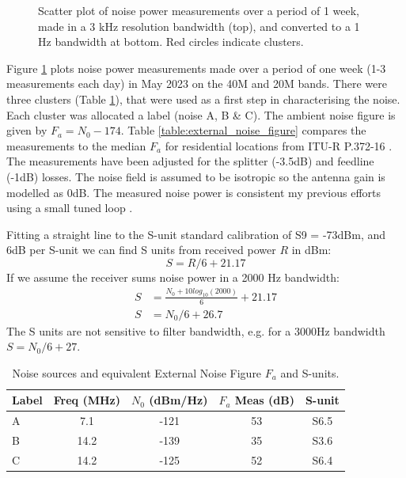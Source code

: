 \documentclass{article}
\begin{document}
\begin{figure}[h]
\caption{Scatter plot of noise power measurements over a period of 1 week, made in a 3 kHz resolution bandwidth (top), and converted to a 1 Hz bandwidth at bottom.  Red circles indicate clusters.}
\label{fig:noise_measurements}
\begin{center}

\end{center}
\end{figure}

Figure \ref{fig:noise_measurements} plots noise power measurements made over a period of one week (1-3 measurements each day) in May 2023 on the 40M and 20M bands.  There were three clusters (Table \ref{table:measurement_clusters}), that were used as a first step in characterising the noise. Each cluster was allocated a label (noise A, B \& C). The ambient noise figure is given by $F_a = N_0 - 174$. Table \ref{table:external_noise_figure} compares the measurements to the median $F_a$ for residential locations from ITU-R P.372-16 \cite{itu372-16}. The measurements have been adjusted for the splitter (-3.5dB) and feedline (-1dB) losses.  The noise field is assumed to be isotropic so the antenna gain is modelled as 0dB. The measured noise power is consistent my previous efforts using a small tuned loop \cite{rowetel_noise_city}.

Fitting a straight line to the S-unit standard calibration of S9 = -73dBm, and 6dB per S-unit we can find S units from received power $R$ in dBm:
\begin{equation}
S = R/6 + 21.17
\end{equation}
If we assume the receiver sums noise power in a 2000 Hz bandwidth:
\begin{equation} \label{eq:s_unit}
\begin{split}
S &= \frac{N_0+10log_{10}(2000)}{6} + 21.17 \\
S &= N_0/6 + 26.7
\end{split}
\end{equation}
The S units are not sensitive to filter bandwidth, e.g. for a 3000Hz bandwidth $S = N_0/6 + 27$.
\begin{table}[h]
\centering
\begin{tabular}{l c c c c}
 \hline
 Label & Freq (MHz) & $N_0$ (dBm/Hz) & $F_a$ Meas (dB) & S-unit \\
 \hline
 A & 7.1  & -121 & 53 & S6.5 \\
 B & 14.2 & -139 & 35 & S3.6 \\
 C & 14.2 & -125 & 52 & S6.4 \\
\end{tabular}
\caption{Noise sources and equivalent External Noise Figure $F_a$ and S-units.}
\label{table:measurement_clusters}
\end{table}
\end{document}
